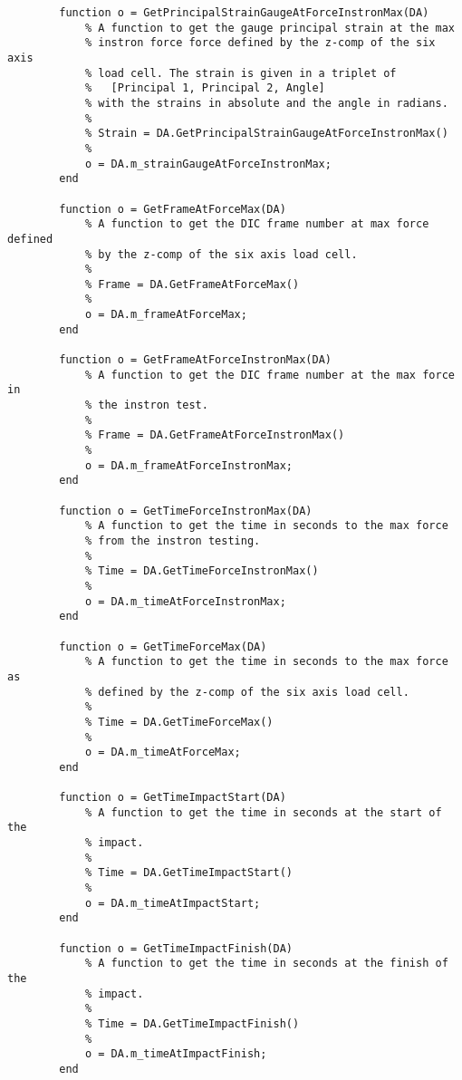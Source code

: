 \begin{lstlisting}
        function o = GetPrincipalStrainGaugeAtForceInstronMax(DA)
            % A function to get the gauge principal strain at the max
            % instron force force defined by the z-comp of the six axis 
            % load cell. The strain is given in a triplet of
            %   [Principal 1, Principal 2, Angle]
            % with the strains in absolute and the angle in radians.
            %
            % Strain = DA.GetPrincipalStrainGaugeAtForceInstronMax()
            %
            o = DA.m_strainGaugeAtForceInstronMax;
        end
        
        function o = GetFrameAtForceMax(DA)
            % A function to get the DIC frame number at max force defined
            % by the z-comp of the six axis load cell.
            %
            % Frame = DA.GetFrameAtForceMax()
            %
            o = DA.m_frameAtForceMax;
        end
        
        function o = GetFrameAtForceInstronMax(DA)
            % A function to get the DIC frame number at the max force in
            % the instron test.
            %
            % Frame = DA.GetFrameAtForceInstronMax()
            %
            o = DA.m_frameAtForceInstronMax;
        end
            
        function o = GetTimeForceInstronMax(DA)
            % A function to get the time in seconds to the max force
            % from the instron testing.
            %
            % Time = DA.GetTimeForceInstronMax()
            %
            o = DA.m_timeAtForceInstronMax;
        end
        
        function o = GetTimeForceMax(DA)
            % A function to get the time in seconds to the max force as
            % defined by the z-comp of the six axis load cell.
            %
            % Time = DA.GetTimeForceMax()
            %
            o = DA.m_timeAtForceMax;
        end
        
        function o = GetTimeImpactStart(DA)
            % A function to get the time in seconds at the start of the
            % impact.
            %
            % Time = DA.GetTimeImpactStart()
            %
            o = DA.m_timeAtImpactStart;
        end
        
        function o = GetTimeImpactFinish(DA)
            % A function to get the time in seconds at the finish of the
            % impact.
            %
            % Time = DA.GetTimeImpactFinish()
            %
            o = DA.m_timeAtImpactFinish;
        end
        

\end{lstlisting}
